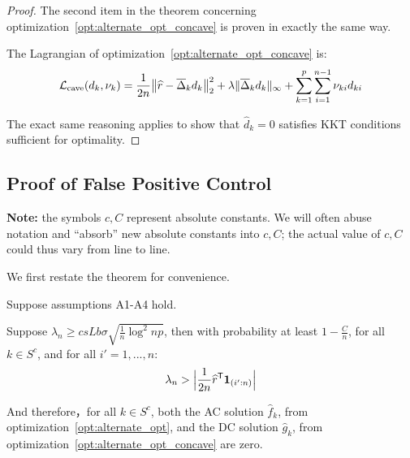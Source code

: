 \begin{proof}
The second item in the theorem concerning optimization~\ref{opt:alternate_opt_concave} is proven in exactly the same way. 

The Lagrangian of optimization~\ref{opt:alternate_opt_concave} is:
\[
\mathcal{L}_{\textrm{cave}}(d_k, \nu_k) = 
  \frac{1}{2n} \big\| \widehat{r} - \overline{\Delta}_k d_k \big \|_2^2 + 
  \lambda \| \overline{\Delta}_k d_k \|_\infty + \sum_{k=1}^p \sum_{i=1}^{n-1} \nu_{ki} d_{ki}
\]

The exact same reasoning applies to show that $\hat{d}_k = 0$ satisfies KKT conditions sufficient for optimality.

\end{proof}
 
 
 
 
 
 
 \subsection{Proof of False Positive Control}
 \label{sec:false_positive_proof}
 
\textbf{Note:} the symbols $c,C$ represent absolute constants. We will often abuse notation and ``absorb'' new absolute constants into $c, C$; the actual value of $c, C$ could thus vary from line to line.

 We first restate the theorem for convenience. 
 

\begin{theorem} 
Suppose assumptions A1-A4 hold. 

Suppose $\lambda_n \geq c s Lb \sigma  \sqrt{ \frac{1}{n} \log^2 np}$, then with probability at least $ 1 - \frac{C}{n}$, for all $k \in S^c$, and for all $i'=1,...,n$:
\[
\lambda_n > \Big| \frac{1}{2n}\widehat{r}^{\mathsf{T}} \mbox{\boldmath $1$}_{(i':n)} \Big|
\]

And therefore，for all $k \in S^c$, both the AC solution $\hat{f}_k$, from optimization~\ref{opt:alternate_opt}, and the DC solution $\hat{g}_k$, from optimization~\ref{opt:alternate_opt_concave} are zero. 
\end{theorem}

